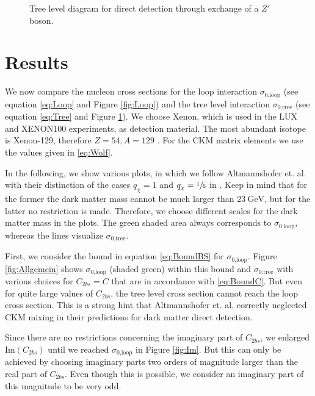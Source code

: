 \begin{figure}
	\centering
	\resizebox{.3\textwidth}{!}{
		
	}
	\caption{Tree level diagram for direct detection through exchange of a $Z'$ boson.}
	\label{fig:Tree}
\end{figure}

\section{Results}
We now compare the nucleon cross sections for the loop interaction $\sigma_\text{0,loop}$ (see equation \eqref{eq:Loop} and Figure \ref{fig:Loop}) and the tree level interaction $\sigma_\text{0,tree}$ (see equation \eqref{eq:Tree} and Figure \ref{fig:Tree}). We choose Xenon, which is used in the LUX and XENON100 experiments, as detection material. The most abundant isotope is Xenon-129, therefore $Z = 54, A=129$ \cite{DD}. For the CKM matrix elements we use the values given in \eqref{eq:Wolf}.


In the following, we show various plots, in which we follow Altmannshofer et. al. with their distinction of the cases $q_\chi= 1$ and $q_\chi=\sfrac{1}{6}$ in \cite{Z}. Keep in mind that for the former the dark matter mass cannot be much larger than $\SI{23}{\giga\electronvolt}$, but for the latter no restriction is made. Therefore, we choose different scales for the dark matter mass in the plots. The green shaded area always corresponds to $\sigma_\text{0,loop}$, whereas the lines visualize $\sigma_\text{0,tree}$.


First, we consider the bound in equation \eqref{eq:BoundBS} for $\sigma_\text{0,loop}$. Figure \ref{fig:Allgemein} shows $\sigma_\text{0,loop}$ (shaded green) within this bound and $\sigma_\text{0,tree}$ with various choices for $C_{2bs} = C$ that are in accordance with \eqref{eq:BoundC}. But even for quite large values of $C_{2bs}$, the tree level cross section cannot reach the loop cross section. This is a strong hint that Altmannshofer et. al. correctly neglected CKM mixing in their predictions for dark matter direct detection.


Since there are no restrictions concerning the imaginary part of $C_{2bs}$, we enlarged $\text{Im}(C_{2bs})$ until we reached $\sigma_\text{0,loop}$ in Figure \ref{fig:Im}. But this can only be achieved by choosing imaginary parts two orders of magnitude larger than the real part of $C_{2bs}$. Even though this is possible, we consider an imaginary part of this magnitude to be very odd.


